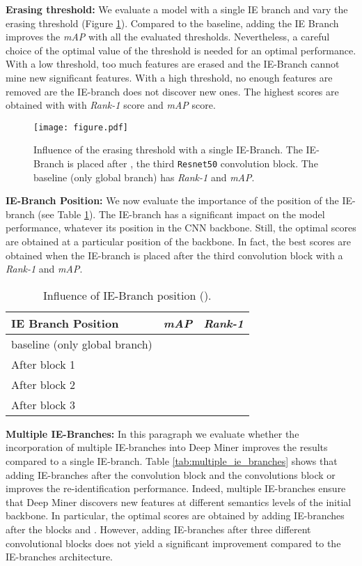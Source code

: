 \documentclass[final]{cvpr}
\begin{document}
\textbf{Erasing threshold:} We evaluate a model with a single IE branch and vary the erasing threshold (Figure \ref{tab:erasing_th}).  Compared to the baseline,  adding the IE Branch improves the \textit{mAP} with all the evaluated thresholds. Nevertheless, a careful choice of the optimal value of the threshold is needed for an optimal performance. With a low threshold, too much features are erased and the IE-Branch cannot mine new significant features. With a high threshold, no enough features are removed are the IE-branch does not discover new ones. The highest scores are obtained with  with  \textit{Rank-1} score and  \textit{mAP} score.

\begin{figure}[h!]
    \centering
    \texttt{[image: figure.pdf]}
    \caption{Influence of the erasing threshold  with a single IE-Branch. The IE-Branch is placed after ,  the third \texttt{Resnet50} convolution block. The baseline (only global branch) has  \textit{Rank-1} and  \textit{mAP}.}
    \label{tab:erasing_th}
\end{figure}


\textbf{IE-Branch Position:} We now evaluate the importance of the position of the IE-branch (see Table \ref{tab:erasing_pos}). The IE-branch has a significant impact on the model performance, whatever its position in the CNN backbone. Still, the optimal scores are obtained at a particular position of the backbone. In fact, the best scores are obtained when the IE-branch is placed after the third convolution block with a  \textit{Rank-1} and  \textit{mAP}. 

\begin{table}[h!]
\centering
\footnotesize
\begin{tabular}{@{}lll@{}}
\toprule
IE Branch Position             & \textit{mAP} & \textit{Rank-1}     \\ \midrule
baseline (only global branch)    &  &     \\
After block 1                    &   &      \\
After block 2                    &  &     \\
After block 3                  &  &     \\ \bottomrule
\end{tabular}
\caption{Influence of IE-Branch position ().}
\label{tab:erasing_pos}
\end{table}

\textbf{Multiple IE-Branches:} In this paragraph we evaluate whether the incorporation of multiple IE-branches into Deep Miner improves the results compared to a single IE-branch. Table \ref{tab:multiple_ie_branches} shows that adding IE-branches after the convolution block  and the convolutions block  or  improves the re-identification performance. Indeed, multiple IE-branches ensure that Deep Miner discovers new features at different semantics levels of the initial backbone. In particular, the optimal scores are obtained by adding IE-branches after the blocks  and . However, adding IE-branches after three different convolutional blocks does not yield a significant improvement compared to the  IE-branches architecture. 
\end{document}
